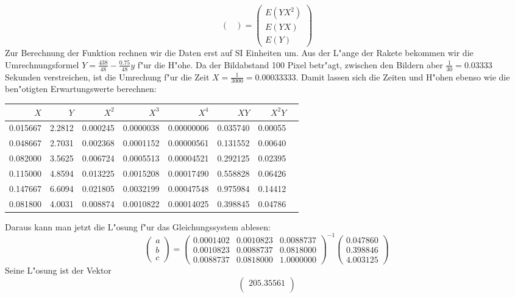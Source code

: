 \begin{loesung}
\begin{teilaufgaben}
\[\begin{pmatrix}
\end{pmatrix}
=
\begin{pmatrix}
E(YX^2)\\E(YX)\\E(Y)
\end{pmatrix}
\]
Zur Berechnung der Funktion rechnen wir die Daten erst auf SI Einheiten
um. Aus der L"ange der Rakete bekommen wir die Umrechnungsformel
$Y=\frac{438}{48} - \frac{0.75}{48}y$ f"ur die H"ohe.
Da der Bildabstand 100 Pixel
betr"agt, zwischen den Bildern aber $\frac{1}{30}=0.03333$ Sekunden verstreichen,
ist die Umrechung f"ur die Zeit $X=\frac{1}{3000}=0.00033333$. Damit
lassen sich die Zeiten und H"ohen ebenso wie die ben"otigten Erwartungswerte
berechnen:
\begin{center}
\begin{tabular}{rrrrrrrr}
\hline
$X$&$Y$&$X^2$&$X^3$&$X^4$&$XY$&$X^2Y$\\
\hline
0.015667&2.2812&0.000245&0.0000038&0.00000006&0.035740&0.00055\\
0.048667&2.7031&0.002368&0.0001152&0.00000561&0.131552&0.00640\\
0.082000&3.5625&0.006724&0.0005513&0.00004521&0.292125&0.02395\\
0.115000&4.8594&0.013225&0.0015208&0.00017490&0.558828&0.06426\\
0.147667&6.6094&0.021805&0.0032199&0.00047548&0.975984&0.14412\\
\hline
0.081800&4.0031&0.008874&0.0010822&0.00014025&0.398845&0.04786\\
\hline
\end{tabular}
\end{center}
Daraus kann man jetzt die L"osung f"ur das Gleichungssystem ablesen:
\[
\begin{pmatrix}
a\\b\\c
\end{pmatrix}
=\begin{pmatrix}
0.0001402&0.0010823&0.0088737\\
0.0010823&0.0088737&0.0818000\\
0.0088737&0.0818000&1.0000000
\end{pmatrix}^{-1}
\begin{pmatrix}
0.047860\\
0.398846\\
4.003125
\end{pmatrix}
\]
Seine L"osung ist der Vektor
\[
\begin{pmatrix}
   205.35561\\

\end{pmatrix}\]
\end{teilaufgaben}
\end{loesung}
